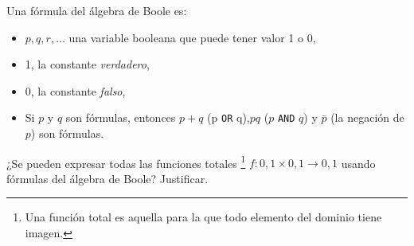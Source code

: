 \begin{enunciado}{\ejercicio}
  Una fórmula del álgebra de Boole es:
  \begin{itemize}[label=\tiny$\blacksquare$]
    \item $p,q, r,\dots$ una variable booleana que puede tener valor 1 o 0,
    \item 1, la constante \textit{verdadero},
    \item 0, la constante \textit{falso},
    \item Si $p$ y $q$ son fórmulas, entonces $p+q$ (p \texttt{OR} q),$pq$ ($p$ \texttt{AND} $q$) y $\bar{p}$ (la negación de $p$)
          son fórmulas.
  \end{itemize}
  ¿Se pueden expresar todas las funciones totales
  \footnote{Una función total es aquella para la que todo elemento del dominio tiene imagen.}
  $f: {0,1} \times {0,1} \to {0,1}$ usando fórmulas del álgebra de Boole? Justificar.
\end{enunciado}
